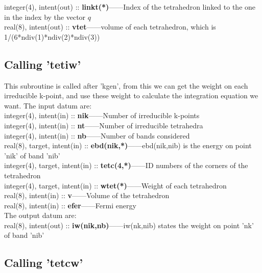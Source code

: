 \documentclass[10pt]{article}
\begin{document}
integer(4), intent(out) :: \textbf{linkt(*)}------Index of the tetrahedron linked to the one in the index by the vector $q$\\

real(8), intent(out) :: \textbf{vtet}------volume of each tetrahedron, which is 1/(6*ndiv(1)*ndiv(2)*ndiv(3))\\


\subsection{Calling 'tetiw'}

This subroutine is called after 'kgen', from this we can get the weight on each irreducible k-point, and use these weight to calculate the integration equation we want.  The input datum are:\\

integer(4), intent(in) :: \textbf{nik}------Number of irreducible k-points\\

integer(4), intent(in) :: \textbf{nt}------Number of irreducible tetrahedra\\

integer(4), intent(in) :: \textbf{nb}------Number of bands considered\\

real(8), target, intent(in) :: \textbf{ebd(nik,*)}------ebd(nik,nib) is the energy on point 'nik' of band 'nib'\\

integer(4), target, intent(in) :: \textbf{tetc(4,*)}------ID numbers of the corners of the tetrahedron\\
    
integer(4), target, intent(in) :: \textbf{wtet(*)}------Weight of each tetrahedron\\

real(8), intent(in) :: \textbf{v}------Volume of the tetrahedron\\
      
real(8), intent(in) :: \textbf{efer}------Fermi energy\\

The output datum are:\\

real(8), intent(out) :: \textbf{iw(nik,nb)}------iw(nk,nib) states the weight on point 'nk' of band 'nib'\\

\subsection{Calling 'tetcw'}
\end{document}
